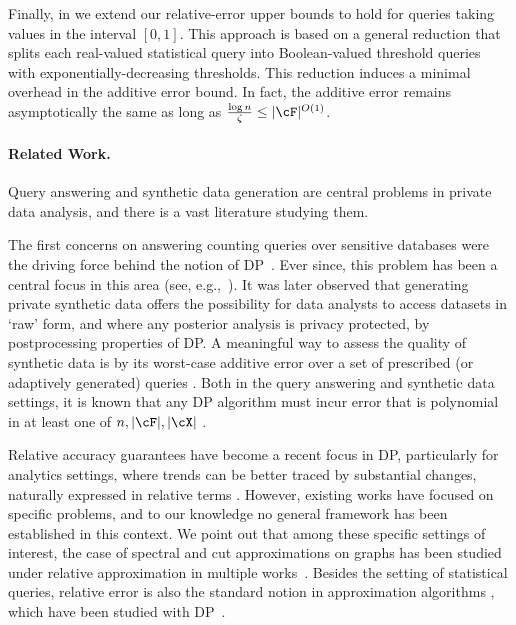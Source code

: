 Finally, in  we extend our relative-error upper bounds to hold for queries taking values in the interval $[0, 1]$. This approach is based on a general reduction that splits each real-valued statistical query into Boolean-valued threshold queries with exponentially-decreasing thresholds. This reduction induces a minimal overhead in the additive error bound. In fact, the additive error remains asymptotically the same as long as $\frac{\log n}{\zeta} \leq |\cF|^{O(1)}$. 

\paragraph{Related Work.}
Query answering and synthetic data generation are central problems in private data analysis, and there is a vast literature studying them.

The first concerns on answering counting queries over sensitive databases were the driving force behind the notion of DP~\citep{Dinur:2003,Dwork:2006}. Ever since, this problem has been a central focus in this area (see, e.g.,~\cite{Hay:2010,Li:2010matrix_mech,Hardt:2010,Gupta:2011,Nikolov:2013,Dwork:2015}). It was later observed that generating private synthetic data offers the possibility for data analysts to access datasets in `raw' form, and where any posterior analysis is privacy protected, by postprocessing properties of DP. A meaningful way to assess the quality of synthetic data is by its worst-case additive error over a set of prescribed (or adaptively generated) queries \citep{Barak:2007,BlumLR13,HardtR10,HardtLM12,GuptaRU12,Hsu:2013,Gaboardi:2014}. Both in the query answering and synthetic data settings, it is known that any DP algorithm must incur error that is polynomial in at least one of $n,|\cF|,|\cX|$ \citep{HardtPhDThesis:2011,Bun:2014}. 

Relative accuracy guarantees have become a recent focus in DP, particularly for analytics settings, where trends can be better traced by substantial changes, naturally expressed in relative terms \citep{Cormode:2012,Qardaji:2013,Zhang:2016PrivTree,EpastoMMMVZ23,Ghazi:2023}. 
However, existing works have focused on specific problems, and to our knowledge no general framework has been established in this context. We point out that among these specific settings of interest, the case of spectral and cut approximations on graphs has been studied under relative approximation in multiple works~\cite[e.g.,][]{Blocki:2012,Arora:2019}. Besides the setting of statistical queries, relative error is also the standard notion in approximation algorithms \citep[see, e.g.,][]{WS11}, which have been studied with DP~\citep{GuptaLMRT10}.